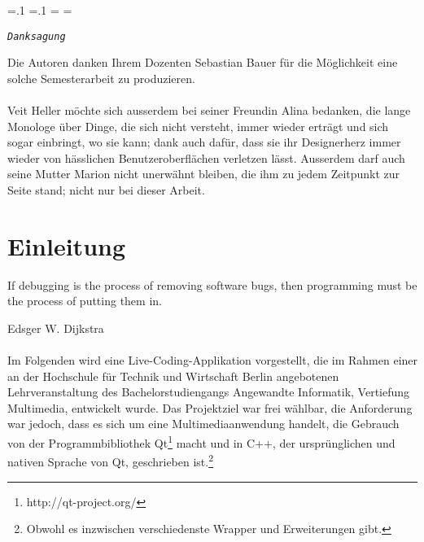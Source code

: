 \clearpage
{}
\begin{list}{}{
\leftmargin=.1\textwidth
\rightmargin=.1\textwidth
\listparindent=\parindent
\itemindent=\parindent
\itemsep=0pt
\parsep=0pt}
\item\relax
\begin{center}
    \texttt{\textit{Danksagung}}
    \linebreak
\end{center}
    Die Autoren danken Ihrem Dozenten Sebastian Bauer für die Möglichkeit eine solche Semesterarbeit zu produzieren.
\paragraph{}
    Veit Heller möchte sich ausserdem bei seiner Freundin Alina bedanken, die lange Monologe über Dinge, die sich nicht versteht, immer wieder 
    erträgt und sich sogar einbringt, wo sie kann; dank auch dafür, dass sie ihr Designerherz immer wieder von hässlichen Benutzeroberflächen 
    verletzen lässt. Ausserdem darf auch seine Mutter Marion nicht unerwähnt bleiben, die ihm zu jedem Zeitpunkt zur Seite stand; nicht nur bei 
    dieser Arbeit.
\end{list}
\clearpage

\newpage

\tableofcontents

\newpage

\section{Einleitung}
\epigraph{If debugging is the process of removing software bugs, then programming must be the process of putting them in.}{Edsger W. Dijkstra}
\paragraph{}
    Im Folgenden wird eine Live-Coding-Applikation vorgestellt, die im Rahmen einer an der Hochschule für Technik und Wirtschaft
	Berlin angebotenen Lehrveranstaltung des Bachelorstudiengangs Angewandte Informatik, Vertiefung Multimedia, entwickelt wurde.
	Das Projektziel war frei wählbar, die Anforderung war jedoch, dass es sich um eine Multimediaanwendung handelt, die Gebrauch von
	der Programmbibliothek Qt\footnote{http://qt-project.org/} macht und in C++, der ursprünglichen und nativen Sprache von Qt, 
	geschrieben ist.\footnote{Obwohl es inzwischen verschiedenste Wrapper und Erweiterungen gibt.}
